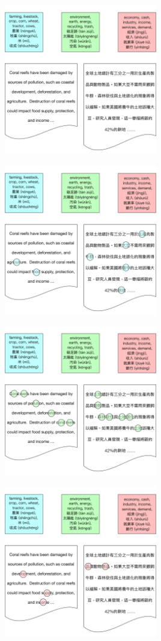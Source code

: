 \begin{frame}

\begin{center}
\begin{overprint}
\centerline{\includegraphics[width=0.5\textwidth]{topic_models/mtanchor/articles1}}
\centerline{\includegraphics[width=0.5\textwidth]{topic_models/mtanchor/articles2}}
\centerline{\includegraphics[width=0.5\textwidth]{topic_models/mtanchor/articles3}}
\centerline{\includegraphics[width=0.5\textwidth]{topic_models/mtanchor/articles4}}

\end{overprint}
\end{center}
\end{frame}
